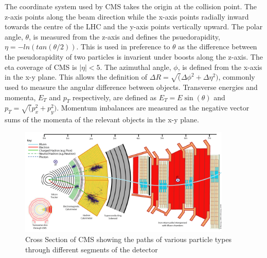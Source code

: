 The coordinate system used by CMS takes the origin at 
the collision point. The z-axis points along the beam direction while the x-axis points radially inward
towards the centre of the LHC and the y-axis points vertically upward.
The polar angle, $\theta$, is measured from the z-axis and defines the psuedorapidity, $\eta=-ln(tan(\theta/2))$. 
This is used in preference to $\theta$ as the difference between the pseudorapidity of two 
particles is invarient under boosts along the z-axis. 
The eta coverage of CMS is $|\eta|<5$. The azimuthal angle, $\phi$, is defined from the x-axis in the x-y plane.
This allows the definition of $\Delta R = \sqrt(\Delta\phi^2+\Delta\eta^2)$, commonly used to measure the 
angular difference between objects. Transverse energies and momenta, $E_T $ and $p_T$ respectively, are defined \cite{cmsiop}
as $E_T = E\sin(\theta)$ and $p_T = \sqrt(p_{x}^2+p_{y}^2)$. Momentum imbalances are measured as the negative 
vector sums of the momenta of the relevant objects in the x-y plane. 

\begin{figure}
\centering
    \includegraphics[width=0.9\textwidth]{./Figures/detector/CMS_Slice.jpg}
  \caption{Cross Section of CMS showing the paths of various particle types 
  through different segments of the detector \cite{cmsslice}}
  \label{CMS_SLICE}
\end{figure}

